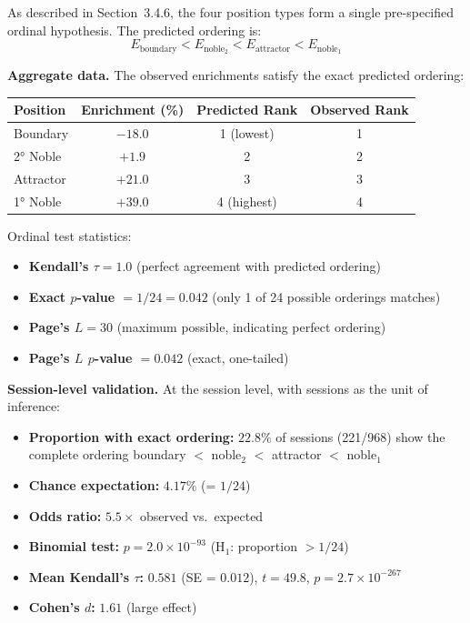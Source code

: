 \documentclass[11pt,a4paper]{article}
\begin{document}
As described in Section~3.4.6, the four position types form a single pre-specified ordinal hypothesis. The predicted ordering is:
\begin{equation}
E_{\text{boundary}} < E_{\text{noble}_2} < E_{\text{attractor}} < E_{\text{noble}_1}
\end{equation}

\textbf{Aggregate data.} The observed enrichments satisfy the exact predicted ordering:
\begin{center}
\begin{tabular}{lccc}
\toprule
Position & Enrichment (\%) & Predicted Rank & Observed Rank \\
\midrule
Boundary & $-18.0$ & 1 (lowest) & 1 \\
2° Noble & $+1.9$ & 2 & 2 \\
Attractor & $+21.0$ & 3 & 3 \\
1° Noble & $+39.0$ & 4 (highest) & 4 \\
\bottomrule
\end{tabular}
\end{center}

Ordinal test statistics:
\begin{itemize}
    \item \textbf{Kendall's $\tau = 1.0$} (perfect agreement with predicted ordering)
    \item \textbf{Exact $p$-value $= 1/24 = 0.042$} (only 1 of 24 possible orderings matches)
    \item \textbf{Page's $L = 30$} (maximum possible, indicating perfect ordering)
    \item \textbf{Page's $L$ $p$-value $= 0.042$} (exact, one-tailed)
\end{itemize}

\textbf{Session-level validation.} At the session level, with sessions as the unit of inference:
\begin{itemize}
    \item \textbf{Proportion with exact ordering:} $22.8\%$ of sessions (221/968) show the complete ordering boundary $<$ noble$_2$ $<$ attractor $<$ noble$_1$
    \item \textbf{Chance expectation:} $4.17\%$ (= $1/24$)
    \item \textbf{Odds ratio:} $5.5\times$ observed vs.\ expected
    \item \textbf{Binomial test:} $p = 2.0 \times 10^{-93}$ (H$_1$: proportion $> 1/24$)
    \item \textbf{Mean Kendall's $\tau$:} $0.581$ (SE = $0.012$), $t = 49.8$, $p = 2.7 \times 10^{-267}$
    \item \textbf{Cohen's $d$:} $1.61$ (large effect)
\end{itemize}
\end{document}
